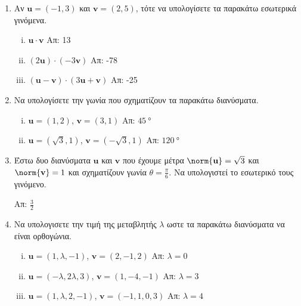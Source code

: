 \begin{enumerate}
    \item Αν $ \mathbf{u} = (-1,3) $ και $ \mathbf{v} = (2,5) $, τότε να υπολογίσετε τα παρακάτω
        εσωτερικά γινόμενα.
        \begin{enumerate}[i)]
            \item $ \mathbf{u} \cdot \mathbf{v} $ \hfill Απ: 13 
            \item $ (2 \mathbf{u}) \cdot (-3 \mathbf{v}) $ \hfill Απ: -78 
            \item $ (\mathbf{u} - \mathbf{v}) \cdot (3 \mathbf{u}+ \mathbf{v}) $ \hfill Απ: -25 
        \end{enumerate}

    \item Να υπολογίσετε την γωνία που σχηματίζουν τα παρακάτω διανύσματα.
        \begin{enumerate}[i)]
            \item $ \mathbf{u} = \left(1,2\right) $, $ \mathbf{v} = \left(3,1\right) $ \hfill Απ: $
                        \SI{45}{\degree} $ 
            \item $ \mathbf{u} = \left(\sqrt{3}, 1\right) $, $ \mathbf{v} = \left(- \sqrt{3} , 
                1\right) $ \hfill Απ: $ \SI{120}{\degree}$ 
        \end{enumerate}

    \item Έστω δυο διανύσματα $ \mathbf{u} $ και $ \mathbf{v} $ που έχουμε μέτρα $ \norm{\mathbf{u}}
        = \sqrt{3} $ και $ \norm{\mathbf{v}} = 1 $ και σχηματίζουν γωνία $ \theta =
        \frac{\pi}{6} $. Να υπολογιστεί το εσωτερικό τους γινόμενο. 

        \hfill Απ: $ \frac{3}{2} $ 

    \item Να υπολογισετε την τιμή της μεταβλητής $ \lambda $ ωστε τα παρακάτω διανύσματα να είναι 
        ορθογώνια.
        \begin{enumerate}[i)]
            \item $ \mathbf{u} = (1, \lambda, -1) $, $ \mathbf{v} = (2,-1,2) $ \hfill 
                Απ: $ \lambda = 0 $
            \item $ \mathbf{u} = (- \lambda, 2 \lambda, 3) $, $ \mathbf{v} = (1,-4,-1) $ \hfill Απ:
                $ \lambda = 3 $ 
            \item $ \mathbf{u} = (1, \lambda, 2,-1) $, $ \mathbf{v} = (-1,1,0,3) $ \hfill Απ: $
                \lambda = 4 $ 
        \end{enumerate}
\end{enumerate}




